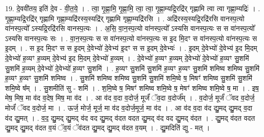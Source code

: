 \documentclass[17pt]{extarticle}
\begin{document}
19. दे॒ववी॑तय॒ इति॑ दे॒व - वी॒त॒ये॒ । . त्वा॒ गृ॒ह्णा॒मि॒ गृ॒ह्णा॒मि॒ त्वा॒ त्वा॒ गृ॒ह्णा॒म्यद्रि॒रद्रि॑र् गृह्णामि त्वा त्वा गृह्णा॒म्यद्रिः॑ । . गृ॒ह्णा॒म्यद्रि॒रद्रि॑र् गृह्णामि गृह्णा॒म्यद्रि॑रस्य॒स्यद्रि॑र् गृह्णामि गृह्णा॒म्यद्रि॑रसि । . अद्रि॑रस्य॒स्यद्रि॒रद्रि॑रसि वानस्प॒त्यो वा॑नस्प॒त्यो᳚ ऽस्यद्रि॒रद्रि॑रसि वानस्प॒त्यः । . अ॒सि॒ वा॒न॒स्प॒त्यो वा॑नस्प॒त्यो᳚ ऽस्यसि वानस्प॒त्यः स स वा॑नस्प॒त्यो᳚ ऽस्यसि वानस्प॒त्यः सः । . वा॒न॒स्प॒त्यः स स वा॑नस्प॒त्यो वा॑नस्प॒त्यः स इ॒द मि॒दꣳ स वा॑नस्प॒त्यो वा॑नस्प॒त्यः स इ॒दम् । . स इ॒द मि॒दꣳ स स इ॒दम् दे॒वेभ्यो॑ दे॒वेभ्य॑ इ॒दꣳ स स इ॒दम् दे॒वेभ्यः॑ । . इ॒दम् दे॒वेभ्यो॑ दे॒वेभ्य॑ इ॒द मि॒दम् दे॒वेभ्यो॑ ह॒व्यꣳ ह॒व्यम् दे॒वेभ्य॑ इ॒द मि॒दम् दे॒वेभ्यो॑ ह॒व्यम् । . दे॒वेभ्यो॑ ह॒व्यꣳ ह॒व्यम् दे॒वेभ्यो॑ दे॒वेभ्यो॑ ह॒व्यꣳ सु॒शमि॑ सु॒शमि॑ ह॒व्यम् दे॒वेभ्यो॑ दे॒वेभ्यो॑ ह॒व्यꣳ सु॒शमि॑ । . ह॒व्यꣳ सु॒शमि॑ सु॒शमि॑ ह॒व्यꣳ ह॒व्यꣳ सु॒शमि॑ शमिष्व शमिष्व सु॒शमि॑ ह॒व्यꣳ ह॒व्यꣳ सु॒शमि॑ शमिष्व । . सु॒शमि॑ शमिष्व शमिष्व सु॒शमि॑ सु॒शमि॑ शमि॒ष्वे ष॒ मिषꣳ॑ शमिष्व सु॒शमि॑ सु॒शमि॑ शमि॒ष्वे ष᳚म् । . सु॒शमीति॑ सु - शमि॑ । . श॒मि॒ष्वे ष॒ मिषꣳ॑ शमिष्व शमि॒ष्वे ष॒ मेषꣳ॑ शमिष्व शमि॒ष्वे ष॒ मा । . इष॒ मेष॒ मिष॒ मा व॑द व॒देष॒ मिष॒ मा व॑द । . आ व॑द व॒दा व॒दोर्ज॒ मूर्जं॑ ॅव॒दा व॒दोर्ज᳚म् । . व॒दोर्ज॒ मूर्जं॑ ॅवद व॒दोर्ज॒ मोर्जं॑ ॅवद व॒दोर्ज॒ मा । . ऊर्ज॒ मोर्ज॒ मूर्ज॒ मा व॑द व॒दोर्ज॒मूर्ज॒ मा व॑द । . आ व॑द व॒दा व॑द द्यु॒मद् द्यु॒मद् व॒दा व॑द द्यु॒मत् । . व॒द॒ द्यु॒मद् द्यु॒मद् व॑द वद द्यु॒मद् व॑दत वदत द्यु॒मद् व॑द वद द्यु॒मद् व॑दत । . द्यु॒मद् व॑दत वदत द्यु॒मद् द्यु॒मद् व॑दत व॒यं ॅव॒यं ॅव॑दत द्यु॒मद् द्यु॒मद् व॑दत व॒यम् । . द्यु॒मदिति॑ द्यु - मत् । \newline
\end{document}
